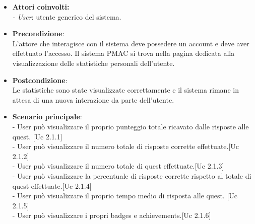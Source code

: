\documentclass[10pt,a4paper]{article}
\begin{document}
\begin{itemize}

\item \textbf{Attori coinvolti:}\\
\emph{- User}: utente generico del sistema.

\item \textbf{Precondizione}:\\
L'attore che interagisce con il sistema deve possedere un account e deve aver effettuato l'accesso. Il sistema PMAC si trova nella pagina dedicata alla visualizzazione delle statistiche personali dell'utente.

\item \textbf{Postcondizione}:\\
Le statistiche sono state visualizzate correttamente e il sistema rimane in attesa di una nuova interazione da parte dell'utente.

\item \textbf{Scenario principale}:\\
- User può visualizzare il proprio punteggio totale ricavato dalle risposte alle quest. [Uc 2.1.1]\\
- User può visualizzare il numero totale di risposte corrette effettuate.[Uc 2.1.2]\\
- User può visualizzare il numero totale di quest effettuate.[Uc 2.1.3]\\
- User può visualizzare la percentuale di risposte corrette rispetto al totale di quest effettuate.[Uc 2.1.4]\\
- User può visualizzare il proprio tempo medio di risposta alle quest. [Uc 2.1.5]\\
- User può visualizzare i propri badges e achievements.[Uc 2.1.6]
\end{itemize}

\newpage
\end{document}
